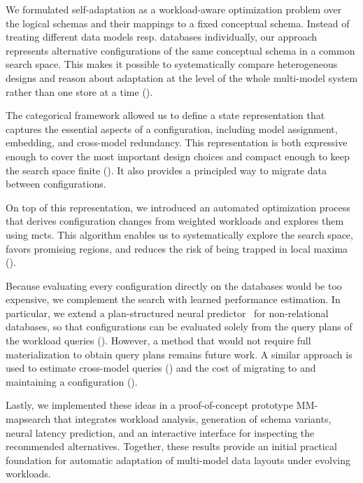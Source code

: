 We formulated self-adaptation as a workload-aware optimization problem over the logical schemas and their mappings to a fixed conceptual schema. Instead of treating different data models resp. databases individually, our approach represents alternative configurations of the same conceptual schema in a common search space. This makes it possible to systematically compare heterogeneous designs and reason about adaptation at the level of the whole multi-model system rather than one store at a time ().

The categorical framework allowed us to define a state representation that captures the essential aspects of a configuration, including model assignment, embedding, and cross-model redundancy. This representation is both expressive enough to cover the most important design choices and compact enough to keep the search space finite (). It also provides a principled way to migrate data between configurations.

On top of this representation, we introduced an automated optimization process that derives configuration changes from weighted workloads and explores them using \acrshort{mcts}. This algorithm enables us to systematically explore the search space, favors promising regions, and reduces the risk of being trapped in local maxima ().

Because evaluating every configuration directly on the databases would be too expensive, we complement the search with learned performance estimation. In particular, we extend a plan-structured neural predictor~\citep{10.14778/3342263.3342646} for non-relational databases, so that configurations can be evaluated solely from the query plans of the workload queries (). However, a method that would not require full materialization to obtain query plans remains future work. A similar approach is used to estimate cross-model queries () and the cost of migrating to and maintaining a configuration ().

Lastly, we implemented these ideas in a proof-of-concept prototype MM-mapsearch that integrates workload analysis, generation of schema variants, neural latency prediction, and an interactive interface for inspecting the recommended alternatives. Together, these results provide an initial practical foundation for automatic adaptation of multi-model data layouts under evolving workloads.
